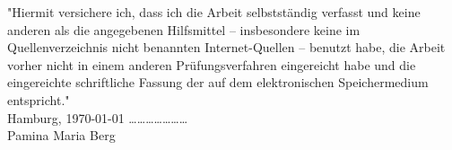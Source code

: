 \documentclass[paper=a4, pagesize, DIV=calc, BCOR=12.5mm, twoside=on, onecolumn=on, open = any, titlepage =on, parskip =half-, headsepline = on, footsepline = on, chapterprefix = on, appendixprefix = off, fontsize = 12pt, numbers = noenddot, abstract = on]{scrbook}
\numberwithin{equation}{chapter}
\theoremstyle{definition}
\theoremstyle{plain}
\theoremstyle{plain}
\theoremstyle{remark}
\theoremstyle{plain}
\theoremstyle{plain}
\begin{document}
\newpage

\newpage
\thispagestyle{empty}
\vspace*{\fill}
"Hiermit versichere ich, dass ich die Arbeit selbstständig verfasst und keine anderen als die angegebenen Hilfsmittel – insbesondere keine im Quellenverzeichnis nicht benannten Internet-Quellen – benutzt habe, die Arbeit vorher nicht in einem anderen Prüfungsverfahren eingereicht habe und die eingereichte schriftliche Fassung der auf dem elektronischen Speichermedium entspricht."\\

Hamburg, \today \hspace*{\fill} \dots \dots \dots \dots \dots \dots \dots\\
\hspace*{\fill} Pamina Maria Berg $\,$
\end{document}
